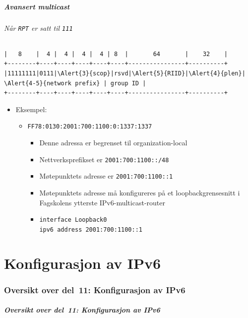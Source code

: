 \begin{frame}[fragile]%
  \frametitle{Avansert multicast}
  \framesubtitle{Når \texttt{RPT} er satt til \texttt{111}}
\begin{Verbatim}[commandchars=\\\{\},fontsize=\tiny]
|   8    |  4 |  4 |  4 |  4 | 8  |       64       |    32    |
+--------+----+----+----+----+----+----------------+----------+
|11111111|0111|\Alert{3}{scop}|rsvd|\Alert{5}{RIID}|\Alert{4}{plen}| \Alert{4-5}{network prefix} | group ID |
+--------+----+----+----+----+----+----------------+----------+
\end{Verbatim}
  \begin{itemize}[<+->]
  \item Eksempel:
    \begin{itemize}[<+->]
    \item \texttt{FF7\alert<3>{8}:0\alert<5>{1}\alert<4>{30}:\alert<4-5>{2001:700:1100:0}:1337:1337}
      \begin{itemize}[<+->]
      \item Denne adressa er begrenset til \alert<3>{organization-local}
      \item Nettverksprefikset er \texttt{\alert<4>{2001:700:1100}::/\alert<4>{48}}
      \item Møtepunktets adresse er \alert<6>{\texttt{\alert<5>{2001:700:1100}::\alert<5>{1}}}
      \item Møtepunktets adresse må konfigureres på et
        loopbackgrensesnitt i Fagskolens ytterste
        IPv6-multicast-router
      \item \texttt{interface Loopback0}\\
        \texttt{ipv6 address 2001:700:1100::1}
      \end{itemize}
    \end{itemize}
  \end{itemize}
\end{frame}

\part{Konfigurasjon av IPv6}

\begin{frame}
  \partpage
\end{frame}

\section*{Oversikt over del~11: Konfigurasjon av IPv6}
\begin{frame}[allowframebreaks]
  \frametitle{Oversikt over del~11: Konfigurasjon av IPv6}
    \tableofcontents%
\end{frame}

